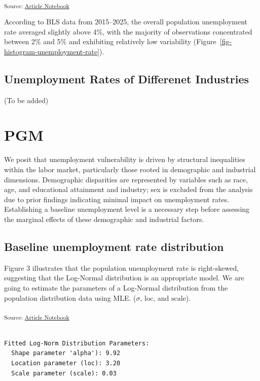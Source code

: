 \documentclass[
]{agujournal2019}
\begin{document}
\textsubscript{Source:
\href{https://mw1296.github.io/dsan5650_social_causal_inference/index.qmd.html}{Article
Notebook}}

According to BLS data from 2015--2025, the overall population
unemployment rate averaged slightly above 4\%, with the majority of
observations concentrated between 2\% and 5\% and exhibiting relatively
low variability (Figure~\ref{fig-histogram-unemployment-rate}).

\subsection{Unemployment Rates of Differenet
Industries}\label{unemployment-rates-of-differenet-industries}

(To be added)

\section{PGM}\label{pgm}

We posit that unemployment vulnerability is driven by structural
inequalities within the labor market, particularly those rooted in
demographic and industrial dimensions. Demographic disparities are
represented by variables such as race, age, and educational attainment
and industry; sex is excluded from the analysis due to prior findings
indicating minimal impact on unemployment rates. Establishing a baseline
unemployment level is a necessary step before assessing the marginal
effects of these demographic and industrial factors.

\subsection{Baseline unemployment rate
distribution}\label{baseline-unemployment-rate-distribution}

Figure 3 illustrates that the population unemployment rate is
right-skewed, suggesting that the Log-Normal distribution is an
appropriate model. We are going to estimate the parameters of a
Log-Normal distribution from the population distribution data using MLE.
(\(\sigma\), \(\text{loc}\), and \(\text{scale}\)).

\textsubscript{Source:
\href{https://mw1296.github.io/dsan5650_social_causal_inference/index.qmd.html}{Article
Notebook}}

\begin{verbatim}

Fitted Log-Norm Distribution Parameters:
  Shape parameter 'alpha'): 9.92
  Location parameter (loc): 3.20
  Scale parameter (scale): 0.03
\end{verbatim}
\end{document}
